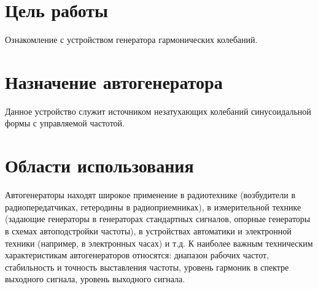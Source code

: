 
\usepackage{textcomp}


\def\labauthors{Войтович Д.А., Карусевич А.А., Разова А.А.}
\def\labgroup{430}
\def\labnumber{1}
\def\labtheme{Генератор гармонических колебаний}
\renewcommand{\vec}{\mathbf}
\renewcommand{\Re}{\operatorname{Re}}
\renewcommand{\Im}{\operatorname{Im}}
\renewcommand{\phi}{\varphi}
\renewcommand{\hat}{\widehat}



\newpage

\section{Цель работы}
Ознакомление с устройством генератора гармонических колебаний.

\section{Назначение автогенератора}
Данное устройство служит источником незатухающих колебаний синусоидальной формы с управляемой частотой.

\section{Области использования}
Автогенераторы находят широкое применение в радиотехнике (возбудители в радиопередатчиках, гетеродины в радиоприемниках), в измерительной технике (задающие генераторы в генераторах стандартных сигналов, опорные генераторы в схемах автоподстройки частоты), в устройствах автоматики и электронной техники (например, в электронных часах) и т.д.
К наиболее важным техническим характеристикам автогенераторов относятся: диапазон рабочих частот, стабильность и точность выставления частоты, уровень гармоник в спектре выходного сигнала, уровень выходного сигнала.

